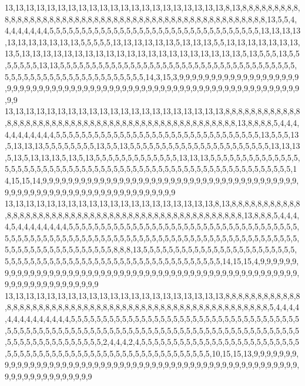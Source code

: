 13,13,13,13,13,13,13,13,13,13,13,13,13,13,13,13,13,13,13,13,13,8,13,8,8,8,8,8,8,8,8,8,8,8,8,8,8,8,8,8,8,8,8,8,8,8,8,8,8,8,8,8,8,8,8,8,8,8,8,8,8,8,8,8,8,8,8,8,8,8,8,8,8,13,5,5,4,4,4,4,4,4,4,4,5,5,5,5,5,5,5,5,5,5,5,5,5,5,5,5,5,5,5,5,5,5,5,5,5,5,5,5,5,5,5,5,5,13,13,13,13,13,13,13,13,13,13,13,5,5,5,5,5,13,13,13,13,13,13,5,13,13,13,5,5,13,13,13,13,13,13,13,13,5,13,13,13,13,13,13,13,13,13,13,13,13,13,13,13,13,13,13,13,13,13,5,13,5,5,5,13,5,5,5,5,5,5,5,13,13,5,5,5,5,5,5,5,5,5,5,5,5,5,5,5,5,5,5,5,5,5,5,5,5,5,5,5,5,5,5,5,5,5,5,5,5,5,5,5,5,5,5,5,5,5,5,5,5,5,5,5,5,5,5,5,5,5,5,5,14,3,15,3,9,9,9,9,9,9,9,9,9,9,9,9,9,9,9,9,9,9,9,9,9,9,9,9,9,9,9,9,9,9,9,9,9,9,9,9,9,9,9,9,9,9,9,9,9,9,9,9,9,9,9,9,9,9,9,9,9,9,9,9,9,9,9,9,9,9,9
13,13,13,13,13,13,13,13,13,13,13,13,13,13,13,13,13,13,13,13,13,8,8,8,8,8,8,8,8,8,8,8,8,8,8,8,8,8,8,8,8,8,8,8,8,8,8,8,8,8,8,8,8,8,8,8,8,8,8,8,8,8,8,8,8,8,8,8,8,13,8,8,8,8,5,4,4,4,4,4,4,4,4,4,4,4,5,5,5,5,5,5,5,5,5,5,5,5,5,5,5,5,5,5,5,5,5,5,5,5,5,5,5,5,5,5,5,5,13,5,5,5,13,5,13,13,13,5,5,5,5,5,5,5,5,13,5,5,13,5,5,5,5,5,5,5,5,5,5,5,5,5,5,5,5,5,5,5,5,5,5,13,13,13,5,13,5,13,13,13,5,13,5,13,5,5,5,5,5,5,5,5,5,5,5,5,5,13,13,13,5,5,5,5,5,5,5,5,5,5,5,5,5,5,5,5,5,5,5,5,5,5,5,5,5,5,5,5,5,5,5,5,5,5,5,5,5,5,5,5,5,5,5,5,5,5,5,5,5,5,5,5,5,5,5,5,5,5,5,14,15,15,14,9,9,9,9,9,9,9,9,9,9,9,9,9,9,9,9,9,9,9,9,9,9,9,9,9,9,9,9,9,9,9,9,9,9,9,9,9,9,9,9,9,9,9,9,9,9,9,9,9,9,9,9,9,9,9,9,9,9,9,9,9,9,9,9,9,9,9
13,13,13,13,13,13,13,13,13,13,13,13,13,13,13,13,13,13,13,13,8,13,8,8,8,8,8,8,8,8,8,8,8,8,8,8,8,8,8,8,8,8,8,8,8,8,8,8,8,8,8,8,8,8,8,8,8,8,8,8,8,8,8,8,8,8,8,8,8,8,13,8,8,8,5,4,4,4,4,5,4,4,4,4,4,4,4,4,5,5,5,5,5,5,5,5,5,5,5,5,5,5,5,5,5,5,5,5,5,5,5,5,5,5,5,5,5,5,5,5,5,5,5,5,5,5,5,5,5,5,5,5,5,5,5,5,5,5,5,5,5,5,5,5,5,5,5,5,5,5,5,5,5,5,5,5,5,5,5,5,5,5,5,5,5,5,5,5,5,5,5,5,5,5,5,5,5,5,5,5,5,5,5,5,5,5,5,8,8,8,13,5,5,5,5,5,5,5,5,5,5,5,5,5,5,5,5,5,5,5,5,5,5,5,5,5,5,5,5,5,5,5,5,5,5,5,5,5,5,5,5,5,5,5,5,5,5,5,5,5,5,5,5,5,5,5,5,5,5,14,15,15,4,9,9,9,9,9,9,9,9,9,9,9,9,9,9,9,9,9,9,9,9,9,9,9,9,9,9,9,9,9,9,9,9,9,9,9,9,9,9,9,9,9,9,9,9,9,9,9,9,9,9,9,9,9,9,9,9,9,9,9,9,9,9,9,9,9,9,9
13,13,13,13,13,13,13,13,13,13,13,13,13,13,13,13,13,13,13,13,13,8,8,8,8,8,8,8,8,8,8,8,8,8,8,8,8,8,8,8,8,8,8,8,8,8,8,8,8,8,8,8,8,8,8,8,8,8,8,8,8,8,8,8,8,8,8,8,8,8,8,8,8,8,5,4,4,4,4,4,4,4,4,4,4,4,4,4,4,5,5,5,5,5,5,5,5,5,5,5,5,5,5,5,5,5,5,5,5,5,5,5,5,5,5,5,5,5,5,5,5,5,5,5,5,5,5,5,5,5,5,5,5,5,5,5,5,5,5,5,5,5,5,5,5,5,5,5,5,5,5,5,5,5,5,5,5,5,5,5,5,5,5,5,5,5,5,5,5,5,5,5,5,5,5,5,5,5,5,5,5,5,5,5,5,5,2,4,4,4,2,4,5,5,5,5,5,5,5,5,5,5,5,5,5,5,5,5,5,5,5,5,5,5,5,5,5,5,5,5,5,5,5,5,5,5,5,5,5,5,5,5,5,5,5,5,5,5,5,5,5,5,5,5,5,5,5,5,5,10,15,15,13,9,9,9,9,9,9,9,9,9,9,9,9,9,9,9,9,9,9,9,9,9,9,9,9,9,9,9,9,9,9,9,9,9,9,9,9,9,9,9,9,9,9,9,9,9,9,9,9,9,9,9,9,9,9,9,9,9,9,9,9,9,9,9,9,9,9,9
